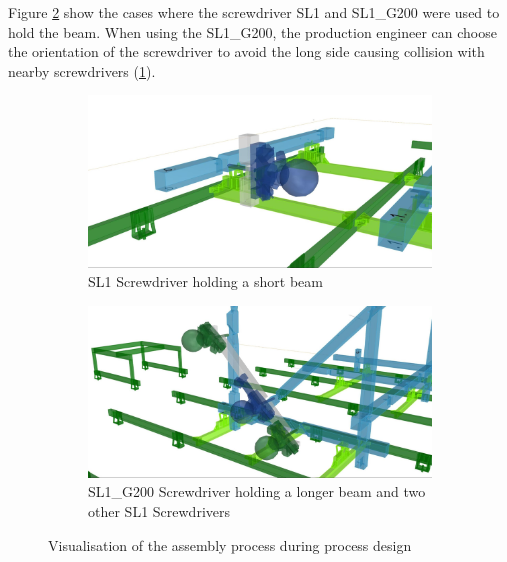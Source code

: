 Figure \ref{fig:visualisation-of-the-assembly-process-2} show the cases where the screwdriver SL1 and SL1\_G200 were used to hold the beam. When using the SL1\_G200, the production engineer can choose the orientation of the screwdriver to avoid the long side causing collision with nearby screwdrivers (\ref{fig:screwdrivers-orientation}). 

\begin{figure}[!h]
    \centering
    \begin{subfigure}[b]{0.49\textwidth}
        \centering
        \includegraphics[width=\textwidth]{images/7a/img87.jpg}
        \caption{SL1 Screwdriver holding a short beam}
    \end{subfigure}
    \hfill
    \begin{subfigure}[b]{0.49\textwidth}
        \centering
        \includegraphics[width=\textwidth]{images/7a/img88.jpg}
        \caption{SL1\_G200 Screwdriver holding a longer beam and two other SL1 Screwdrivers}
        \label{fig:screwdrivers-orientation}
    \end{subfigure}
    \caption{Visualisation of the assembly process during process design}
    \label{fig:visualisation-of-the-assembly-process-2}
\end{figure}

